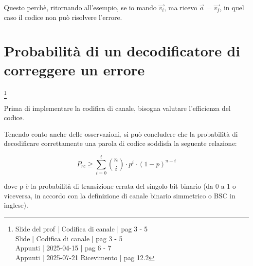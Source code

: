 \begin{tcolorbox}
Questo perchè, ritornando all'esempio, se io mando $\overrightarrow{v_i}$, 
ma ricevo $\overrightarrow{a}$ = $\overrightarrow{v_j}$, 
in quel caso il codice non può risolvere l'errore. 
\end{tcolorbox}

\newpage 

\section{Probabilità di un decodificatore di correggere un errore}
\footnote{Slide del prof | Codifica di canale | pag 3 - 5\\ 
Slide | Codifica di canale | pag  3 - 5\\ 
Appunti | 2025-04-15 | pag 6 - 7 \\
Appunti | 2025-07-21 Ricevimento | pag 12.2
}

Prima di implementare la codifica di canale, 
bisogna valutare l'efficienza del codice. \newline 

Tenendo conto anche delle osservazioni, 
si può concludere che la probabilità di decodificare correttamente una parola di codice soddisfa la seguente relazione: 

{
    \Large 
    \begin{equation}
        P_{rc}
        \ge
        \sum_{i = 0}^{t} 
        \binom{n}{i} \cdot p^{i} \cdot (1 - p)^{n-i}
    \end{equation}
}


dove p è la probabilità di transizione errata del singolo bit binario (da 0 a 1 o viceversa, 
in accordo con la definizione di canale binario simmetrico o BSC in inglese). \newline 

